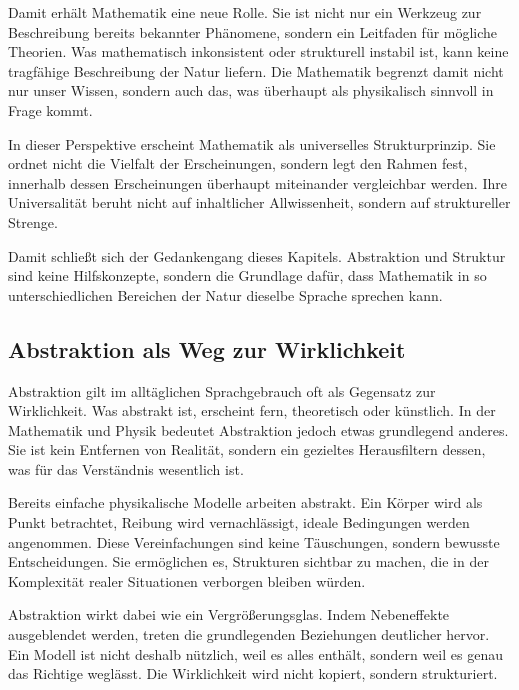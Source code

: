 Damit erhält Mathematik eine neue Rolle. Sie ist nicht nur ein Werkzeug zur Beschreibung bereits bekannter Phänomene, sondern ein Leitfaden für mögliche Theorien. Was mathematisch inkonsistent oder strukturell instabil ist, kann keine tragfähige Beschreibung der Natur liefern. Die Mathematik begrenzt damit nicht nur unser Wissen, sondern auch das, was überhaupt als physikalisch sinnvoll in Frage kommt.

In dieser Perspektive erscheint Mathematik als universelles Strukturprinzip. Sie ordnet nicht die Vielfalt der Erscheinungen, sondern legt den Rahmen fest, innerhalb dessen Erscheinungen überhaupt miteinander vergleichbar werden. Ihre Universalität beruht nicht auf inhaltlicher Allwissenheit, sondern auf struktureller Strenge.

Damit schließt sich der Gedankengang dieses Kapitels. Abstraktion und Struktur sind keine Hilfskonzepte, sondern die Grundlage dafür, dass Mathematik in so unterschiedlichen Bereichen der Natur dieselbe Sprache sprechen kann.

\subsection{Abstraktion als Weg zur Wirklichkeit}

Abstraktion gilt im alltäglichen Sprachgebrauch oft als Gegensatz zur Wirklichkeit. Was abstrakt ist, erscheint fern, theoretisch oder künstlich. In der Mathematik und Physik bedeutet Abstraktion jedoch etwas grundlegend anderes. Sie ist kein Entfernen von Realität, sondern ein gezieltes Herausfiltern dessen, was für das Verständnis wesentlich ist.

Bereits einfache physikalische Modelle arbeiten abstrakt. Ein Körper wird als Punkt betrachtet, Reibung wird vernachlässigt, ideale Bedingungen werden angenommen. Diese Vereinfachungen sind keine Täuschungen, sondern bewusste Entscheidungen. Sie ermöglichen es, Strukturen sichtbar zu machen, die in der Komplexität realer Situationen verborgen bleiben würden.

Abstraktion wirkt dabei wie ein Vergrößerungsglas. Indem Nebeneffekte ausgeblendet werden, treten die grundlegenden Beziehungen deutlicher hervor. Ein Modell ist nicht deshalb nützlich, weil es alles enthält, sondern weil es genau das Richtige weglässt. Die Wirklichkeit wird nicht kopiert, sondern strukturiert.

